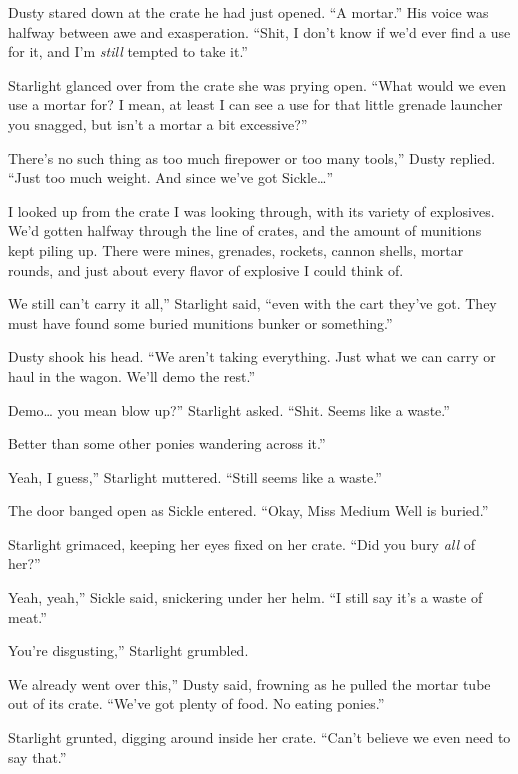 Dusty stared down at the crate he had just opened. “A mortar.” His voice was halfway between awe and exasperation. “Shit, I don’t know if we’d ever find a use for it, and I’m \textit{still} tempted to take it.”

Starlight glanced over from the crate she was prying open. “What would we even use a mortar for? I mean, at least I can see a use for that little grenade launcher you snagged, but isn’t a mortar a bit excessive?”

\leavevmode{}There’s no such thing as too much firepower or too many tools,” Dusty replied. “Just too much weight. And since we’ve got Sickle…”

I looked up from the crate I was looking through, with its variety of explosives. We’d gotten halfway through the line of crates, and the amount of munitions kept piling up. There were mines, grenades, rockets, cannon shells, mortar rounds, and just about every flavor of explosive I could think of.

\leavevmode{}We still can’t carry it all,” Starlight said, “even with the cart they’ve got. They must have found some buried munitions bunker or something.”

Dusty shook his head. “We aren’t taking everything. Just what we can carry or haul in the wagon. We’ll demo the rest.”

\leavevmode{}Demo… you mean blow up?” Starlight asked. “Shit. Seems like a waste.”

\leavevmode{}Better than some other ponies wandering across it.”

\leavevmode{}Yeah, I guess,” Starlight muttered. “Still seems like a waste.”

The door banged open as Sickle entered. “Okay, Miss Medium Well is buried.”

Starlight grimaced, keeping her eyes fixed on her crate. “Did you bury \textit{all} of her?”

\leavevmode{}Yeah, yeah,” Sickle said, snickering under her helm. “I still say it’s a waste of meat.”

\leavevmode{}You’re disgusting,” Starlight grumbled.

\leavevmode{}We already went over this,” Dusty said, frowning as he pulled the mortar tube out of its crate. “We’ve got plenty of food. No eating ponies.”

Starlight grunted, digging around inside her crate. “Can’t believe we even need to say that.”

